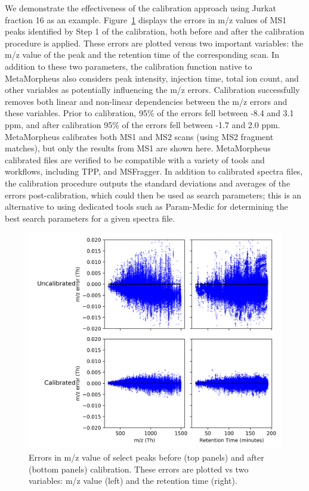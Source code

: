 \documentclass[journal=jprobs,manuscript=article]{achemso}
\begin{document}
We demonstrate the effectiveness of the calibration approach using Jurkat fraction 16 as an example.
Figure~\ref{fgr:fig1-calibErrors} displays the errors in m/z values of MS1 peaks identified by Step 1 of the calibration, both before and after the calibration procedure is applied.
These errors are plotted versus two important variables: the m/z value of the peak and the retention time of the corresponding scan.
In addition to these two parameters, the calibration function native to MetaMorpheus also considers peak intensity, injection time, total ion count, and other variables as potentially influencing the m/z errors.
Calibration successfully removes both linear and non-linear dependencies between the m/z errors and these variables.
Prior to calibration, 95\% of the errors fell between -8.4 and 3.1 ppm, and after calibration 95\% of the errors fell between -1.7 and 2.0 ppm.
MetaMorpheus calibrates both MS1 and MS2 scans (using MS2 fragment matches), but only the results from MS1 are shown here.
MetaMorpheus calibrated files are verified to be compatible with a variety of tools and workflows, including TPP\citep{Deutsch2010}, and MSFragger\citep{Kong_2017}.
In addition to calibrated spectra files, the calibration procedure outputs the standard deviations and averages of the errors post-calibration, which could then be used as search parameters; this is an alternative to using dedicated tools such as Param-Medic\citep{May2017} for determining the best search parameters for a given spectra file.

\begin{figure}[H]
 \includegraphics{fig1-calibErrors.png}
 \caption{Errors in m/z value of select peaks before (top panels) and after (bottom panels) calibration. These errors are plotted vs two variables: m/z value (left) and the retention time (right).}
 \label{fgr:fig1-calibErrors}
\end{figure}
\end{document}
